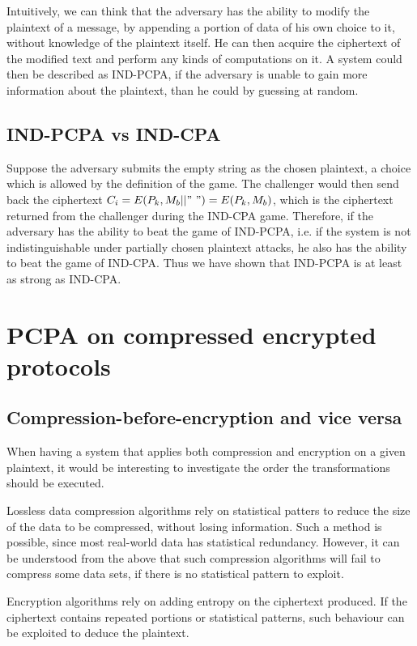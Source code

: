 Intuitively, we can think that the adversary has the ability to modify the
plaintext of a message, by appending a portion of data of his own choice to it,
without knowledge of the plaintext itself. He can then acquire the ciphertext of
the modified text and perform any kinds of computations on it. A system could
then be described as IND-PCPA, if the adversary is unable to gain more
information about the plaintext, than he could by guessing at random.

\subsection{IND-PCPA vs IND-CPA}

Suppose the adversary submits the empty string as the chosen plaintext, a choice
which is allowed by the definition of the game. The challenger would then send
back the ciphertext \begin{math}C_i = E(P_k, M_b||"\ ") = E(P_k, M_b)\end{math},
which is the ciphertext returned from the challenger during the IND-CPA game.
Therefore, if the adversary has the ability to beat the game of IND-PCPA, i.e. if
the system is not indistinguishable under partially chosen plaintext attacks, he
also has the ability to beat the game of IND-CPA. Thus we have shown that
IND-PCPA is at least as strong as IND-CPA.

\section{PCPA on compressed encrypted protocols}\label{sec:cepcpa}

\subsection{Compression-before-encryption and vice versa} When having a system
that applies both compression and encryption on a given plaintext, it would be
interesting to investigate the order the transformations should be executed.

Lossless data compression algorithms rely on statistical patters to reduce the
size of the data to be compressed, without losing information. Such a method is
possible, since most real-world data has statistical redundancy. However, it can
be understood from the above that such compression algorithms will fail to
compress some data sets, if there is no statistical pattern to exploit.

Encryption algorithms rely on adding entropy on the ciphertext produced. If the
ciphertext contains repeated portions or statistical patterns, such behaviour
can be exploited to deduce the plaintext.

